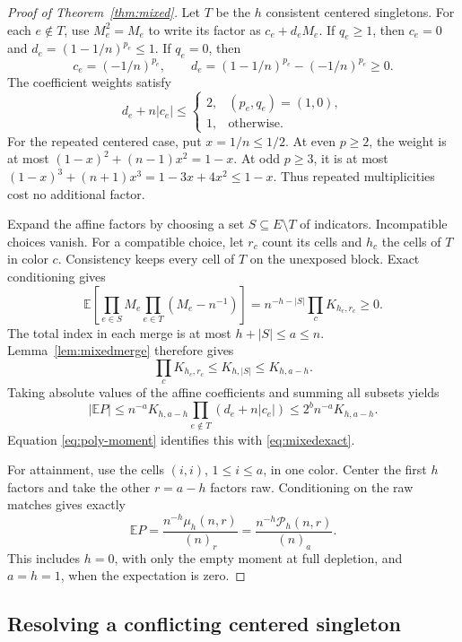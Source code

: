 \documentclass[11pt]{article}
\theoremstyle{definition}
\theoremstyle{remark}
\newcommand{\E}{\mathbb E}
\newcommand{\1}{\mathbf 1}
\begin{document}
\begin{proof}[Proof of Theorem~\ref{thm:mixed}]
Let $T$ be the $h$ consistent centered singletons. For each $e\notin T$, use $M_e^2=M_e$ to write its factor as $c_e+d_eM_e$. If $q_e\ge1$, then $c_e=0$ and $d_e=(1-1/n)^{p_e}\le1$. If $q_e=0$, then
\[
c_e=(-1/n)^{p_e},\qquad
d_e=(1-1/n)^{p_e}-(-1/n)^{p_e}\ge0.
\]
The coefficient weights satisfy
\begin{equation}\label{eq:weights}
d_e+n|c_e|\le
\begin{cases}
2,&(p_e,q_e)=(1,0),\\
1,&\text{otherwise}.
\end{cases}
\end{equation}
For the repeated centered case, put $x=1/n\le1/2$. At even $p\ge2$, the weight is at most
$(1-x)^2+(n-1)x^2=1-x$. At odd $p\ge3$, it is at most
$(1-x)^3+(n+1)x^3=1-3x+4x^2\le1-x$.
Thus repeated multiplicities cost no additional factor.

Expand the affine factors by choosing a set $S\subseteq E\setminus T$ of indicators. Incompatible choices vanish. For a compatible choice, let $r_c$ count its cells and $h_c$ the cells of $T$ in color $c$. Consistency keeps every cell of $T$ on the unexposed block. Exact conditioning gives
\begin{equation}\label{eq:prescribed}
\E\left[\prod_{e\in S}M_e
\prod_{e\in T}(M_e-n^{-1})\right]
=n^{-h-|S|}\prod_cK_{h_c,r_c}\ge0.
\end{equation}
The total index in each merge is at most $h+|S|\le a\le n$. Lemma~\ref{lem:mixedmerge} therefore gives
\[
\prod_cK_{h_c,r_c}\le K_{h,|S|}\le K_{h,a-h}.
\]
Taking absolute values of the affine coefficients and summing all subsets yields
\[
|\E P|\le n^{-a}K_{h,a-h}
\prod_{e\notin T}(d_e+n|c_e|)
\le 2^b n^{-a}K_{h,a-h}.
\]
Equation \eqref{eq:poly-moment} identifies this with \eqref{eq:mixedexact}.

For attainment, use the cells $(i,i)$, $1\le i\le a$, in one color. Center the first $h$ factors and take the other $r=a-h$ factors raw. Conditioning on the raw matches gives exactly
\[
\E P=\frac{n^{-h}\mu_h(n,r)}{(n)_r}
=\frac{n^{-h}\mathcal P_h(n,r)}{(n)_a}.
\]
This includes $h=0$, with only the empty moment at full depletion, and $a=h=1$, when the expectation is zero.
\end{proof}

\subsection{Resolving a conflicting centered singleton}
\end{document}
